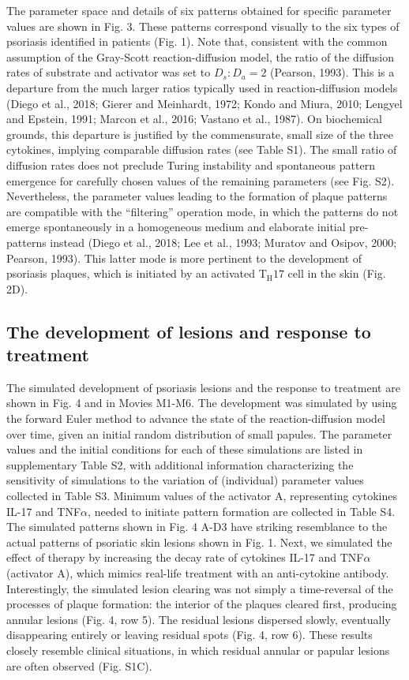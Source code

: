 The parameter space and details of six patterns obtained for specific parameter values are shown in Fig. 3. These patterns correspond visually to the six types of psoriasis identified in patients (Fig. 1). Note that, consistent with the common assumption of the Gray-Scott reaction-diffusion model, the ratio of the diffusion rates of substrate and activator was set to $D_s:D_a=2$ (Pearson, 1993). This is a departure from the much larger ratios typically used in reaction-diffusion models (Diego et al., 2018; Gierer and Meinhardt, 1972; Kondo and Miura, 2010; Lengyel and Epstein, 1991; Marcon et al., 2016; Vastano et al., 1987). On biochemical grounds, this departure is justified by the commensurate, small size of the three cytokines, implying comparable diffusion rates (see Table S1). The small ratio of diffusion rates does not preclude Turing instability and spontaneous pattern emergence for carefully chosen values of the remaining parameters (see Fig. S2). Nevertheless, the  parameter values leading to the formation of plaque patterns are compatible with the ``filtering” operation mode, in which the patterns do not emerge spontaneously in a homogeneous medium and elaborate initial pre-patterns instead (Diego et al., 2018; Lee et al., 1993; Muratov and Osipov, 2000; Pearson, 1993). This latter mode is more pertinent to the development of psoriasis plaques, which is initiated by an activated T$_{\text{H}}17$ cell in the skin (Fig. 2D). 

\subsection{The development of lesions and response to treatment}
The simulated development of psoriasis lesions and the response to treatment are shown in Fig. 4 and in Movies M1-M6. The development was simulated by using the forward Euler method to advance the state of the reaction-diffusion model over time, given an initial random distribution of small papules. The parameter values and the initial conditions for each of these simulations are listed in supplementary Table S2, with additional information characterizing the sensitivity of simulations to the variation of (individual) parameter values collected in Table S3. Minimum values of the activator A, representing cytokines IL-17 and TNF$\alpha$, needed to initiate pattern formation are collected in Table S4. The simulated patterns shown in Fig. 4 A-D3 have striking resemblance to the actual patterns of psoriatic skin lesions shown in Fig. 1. Next, we simulated the effect of therapy by increasing the decay rate of cytokines IL-17 and TNF$\alpha$ (activator A), which mimics real-life treatment with an anti-cytokine antibody. Interestingly, the simulated lesion clearing was not simply a time-reversal of the processes of plaque formation: the interior of the plaques cleared first, producing annular lesions (Fig. 4, row 5). The residual lesions dispersed slowly, eventually disappearing entirely or leaving residual spots (Fig. 4, row 6). These results closely resemble clinical situations, in which residual annular or papular lesions are often observed (Fig. S1C). 

